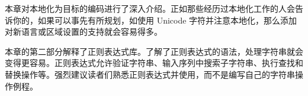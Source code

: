 本章对本地化为目标的编码进行了深入介绍。正如那些经历过本地化工作的人会告诉你的，如果可以事先有所规划，如使用 Unicode 字符并注意本地化，那么添加对新语言或区域设置的支持就会容易得多。

本章的第二部分解释了正则表达式库。了解了正则表达式的语法，处理字符串就会变得更容易。正则表达式允许验证字符串、输入序列中搜索子字符串、执行查找和替换操作等。强烈建议读者们熟悉正则表达式并使用，而不是编写自己的字符串操作例程。
